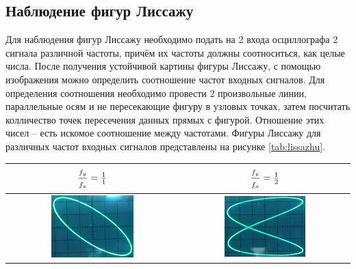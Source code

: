 \documentclass[a4paper,12pt]{article} %
\begin{document}
\subsection{Наблюдение фигур Лиссажу}

Для наблюдения фигур Лиссажу необходимо подать на 2 входа осциллографа 2 	сигнала различной частоты, причём их частоты должны соотноситься, как целые числа. После получения устойчивой картины фигуры Лиссажу, с помощью изображения можно определить соотношение частот входных сигналов. Для определения соотношения необходимо провести 2 произвольные линии, параллельные осям и не пересекающие фигуру в узловых точках, затем посчитать колличество точек пересечения данных прямых с фигурой. Отношение этих чисел -- есть искомое соотношение между частотами. Фигуры Лиссажу для различных частот входных сигналов представлены на рисунке \ref{tab:lissazhu}.

\begin{table}[H]
	\centering
	\begin{tabular}{|c|c|}
		\hline
		{\Large $ \frac{f_y\strut }{f_x\strut } = \frac{1}{1}$}	& {\Large $ \frac{f_y\strut }{f_x\strut } = \frac{1}{2}$} \\ \hline
		\includegraphics[width=0.5\textwidth]{liss_1_1.jpg}	& \includegraphics[width=0.5\textwidth]{liss_1_2.jpg}  \\ \hline
	\end{tabular}
\end{table}
\end{document}
